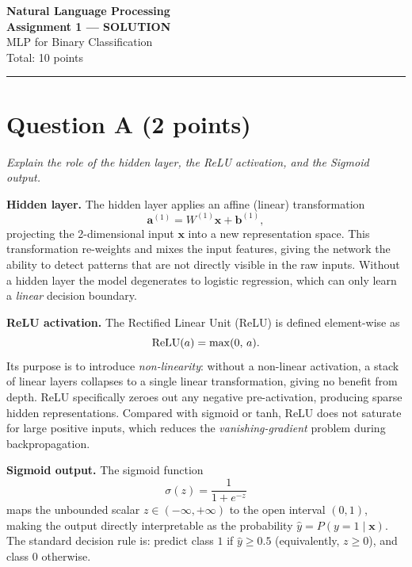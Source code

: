 \documentclass[12pt,a4paper]{article}
\begin{document}
\begin{center}
  {\Large\bfseries Natural Language Processing}\\[0.4em]
  {\large\bfseries Assignment 1 --- SOLUTION}\\[0.2em]
  {\large MLP for Binary Classification}\\[0.2em]
  {\normalsize Total: 10 points}
\end{center}

\noindent\rule{\linewidth}{0.6pt}
\vspace{0.5em}

\section*{Question A \hfill{\normalfont\small(2 points)}}

\noindent\textit{Explain the role of the hidden layer, the ReLU activation,
and the Sigmoid output.}

\medskip

\textbf{Hidden layer.}
The hidden layer applies an affine (linear) transformation
\[
  \mathbf{a}^{(1)} = W^{(1)}\mathbf{x} + \mathbf{b}^{(1)},
\]
projecting the 2-dimensional input $\mathbf{x}$ into a new representation
space.
This transformation re-weights and mixes the input features, giving the
network the ability to detect patterns that are not directly visible in the
raw inputs.
Without a hidden layer the model degenerates to logistic regression, which can
only learn a \emph{linear} decision boundary.

\medskip

\textbf{ReLU activation.}
The Rectified Linear Unit (ReLU) is defined element-wise as
\[
  \operatorname{ReLU}(a) = \max(0,\, a).
\]
Its purpose is to introduce \emph{non-linearity}: without a non-linear
activation, a stack of linear layers collapses to a single linear
transformation, giving no benefit from depth.
ReLU specifically zeroes out any negative pre-activation, producing sparse
hidden representations.
Compared with sigmoid or tanh, ReLU does not saturate for large positive
inputs, which reduces the \emph{vanishing-gradient} problem during
backpropagation.

\medskip

\textbf{Sigmoid output.}
The sigmoid function
\[
  \sigma(z) = \frac{1}{1+e^{-z}}
\]
maps the unbounded scalar $z \in (-\infty,+\infty)$ to the open interval
$(0,1)$, making the output directly interpretable as the probability
$\hat{y} = P(y = 1 \mid \mathbf{x})$.
The standard decision rule is: predict class $1$ if $\hat{y} \ge 0.5$
(equivalently, $z \ge 0$), and class $0$ otherwise.
\end{document}
